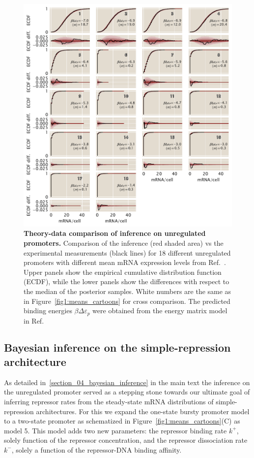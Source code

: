 \begin{figure}[p]
\centering
\includegraphics{../../figures/si/figS0X_ppc.pdf}
\caption{\textbf{Theory-data comparison of inference on unregulated promoters.}
Comparison of the inference (red shaded area) vs the experimental measurements
(black lines) for 18 different unregulated promoters with different mean mRNA
expression levels from Ref.~\cite{Jones2014}. Upper panels show the empirical
cumulative distribution function (ECDF), while the lower panels show the
differences with respect to the median of the posterior samples. White numbers
are the same as in Figure~\ref{fig1:means_cartoons} for cross comparison. The
predicted binding energies $\beta\Delta\varepsilon_p$ were obtained from the
energy matrix model in Ref.~\cite{Brewster2012}}
\label{figS:ppc_unreg}
\end{figure}

\subsection{Bayesian inference on the simple-repression architecture}

As detailed in~\ref{section_04_bayesian_inference} in the main text the
inference on the unregulated promoter served as a stepping stone towards our
ultimate goal of inferring repressor rates from the steady-state mRNA
distributions of simple-repression architectures. For this we expand the
one-state bursty promoter model to a two-state promoter as schematized in
Figure~\ref{fig1:means_cartoons}(C) as model 5. This model adds two new
parameters: the repressor binding rate $k^+$, solely function of the repressor
concentration, and the repressor dissociation rate $k^-$, solely a function of
the repressor-DNA binding affinity.

